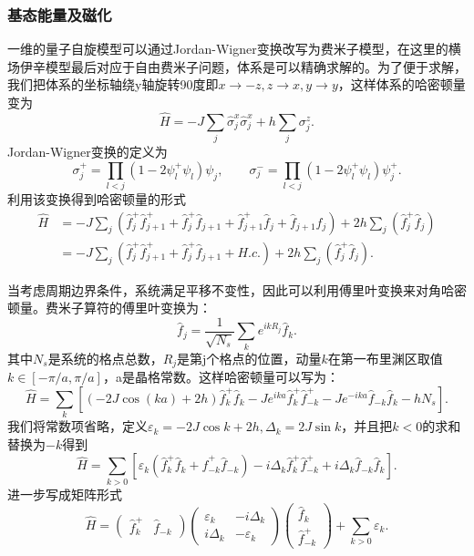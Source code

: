 \documentclass[12pt]{article}
\begin{document}
      \subsubsection{基态能量及磁化}
      一维的量子自旋模型可以通过Jordan-Wigner变换改写为费米子模型，在这里的横场伊辛模型最后对应于自由费米子问题，体系是可以精确求解的\cite{sachdev2011quantum}。为了便于求解，我们把体系的坐标轴绕y轴旋转90度即$x\to-z,z\to x,y\to y$，这样体系的哈密顿量变为
      \begin{equation}\hat{H}=-J\sum_j\hat{\sigma}_j^x \hat{\sigma}_{j}^x + h\sum_j\sigma_{j}^z .\end{equation}
      Jordan-Wigner变换的定义为
      \begin{equation}\sigma_j^+=\prod_{l<j}(1-2\psi_l^+\psi_l)\psi_j, \qquad \sigma_j^-=\prod_{l<j}(1-2\psi_l^+\psi_l)\psi_j^+ .\end{equation}
      利用该变换得到哈密顿量的形式
      \begin{equation}\begin{split} \hat{H}&=-J\sum_j( \hat{f}^+_j\hat{f}^+_{j+1} + \hat{f}^+_j\hat{f}_{j+1} + \hat{f}^+_{j+1}\hat{f}_j + \hat{f}_{j+1}\hat{f}_j ) + 2h\sum_j(\hat{f}^+_j\hat{f}_j) \\ &= -J\sum_j( \hat{f}^+_j\hat{f}^+_{j+1} + \hat{f}^+_j\hat{f}_{j+1} + H.c.)+ 2h\sum_j(\hat{f}^+_j\hat{f}_j).\end{split} \end{equation}
      
      当考虑周期边界条件，系统满足平移不变性，因此可以利用傅里叶变换来对角哈密顿量。费米子算符的傅里叶变换为：
      \begin{equation}\hat{f}_j=\frac{1}{\sqrt{N_s}}\sum_ke^{ikR_j}\hat{f}_k.\end{equation}
      其中$N_s$是系统的格点总数，$R_j$是第j个格点的位置，动量$k$在第一布里渊区取值$k\in[-\pi/a,\pi/a]$，a是晶格常数。这样哈密顿量可以写为：
      \begin{equation}\hat{H}=\sum_k [(-2J\cos (ka)+2h)\hat{f}_k^+\hat{f}_k-Je^{ika}\hat{f}_k^+\hat{f}^+_{-k} -Je^{-ika}\hat{f}_{-k}\hat{f}_{k}-hN_s ].\end{equation}
      我们将常数项省略，定义$\varepsilon_k= -2J\cos k+2h,\Delta_k=2J\sin k$，并且把$k<0$的求和替换为$-k$得到
      \begin{equation} \hat{H}=\sum_{k>0}[\varepsilon_k(\hat{f}_k^+\hat{f}_k + \hat{f}_{-k}^+\hat{f}_{-k})-i\Delta_k\hat{f}_k^+\hat{f}_{-k}^+ + i\Delta_k\hat{f}_{-k}\hat{f}_k] .\end{equation}
      进一步写成矩阵形式
      \begin{equation}\hat{H}= \begin{pmatrix} \hat{f}_k^+&\hat{f}_{-k} \end{pmatrix} \begin{pmatrix} \varepsilon_k&-i\Delta_k\\i\Delta_k&-\varepsilon_k  \end{pmatrix} \begin{pmatrix} \hat{f}_k\\\hat{f}_{-k}^+ \end{pmatrix}+\sum_{k>0}\varepsilon_k .\end{equation}
      
\end{document}
